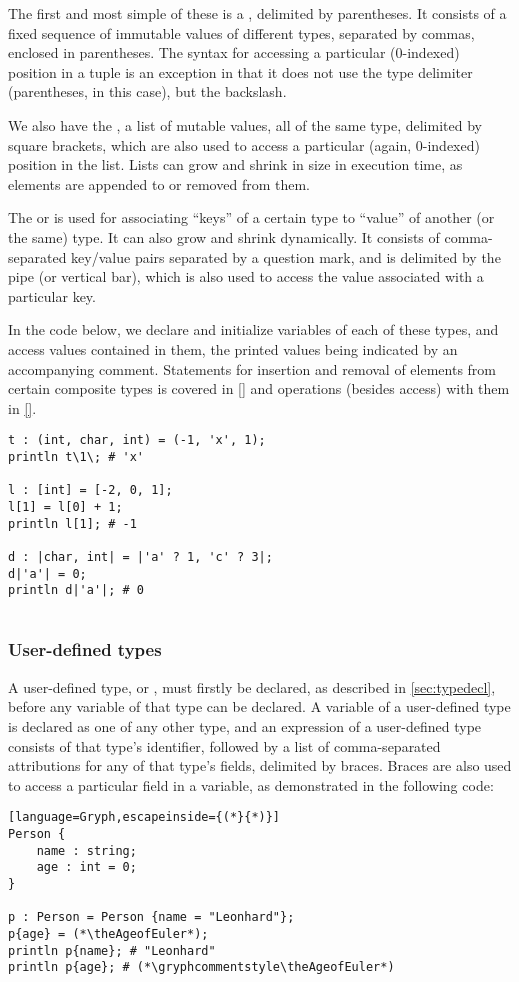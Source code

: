 The first and most simple of these is a , delimited by parentheses. It consists of a fixed sequence of immutable values of different types, separated by commas, enclosed in parentheses. The syntax for accessing a particular (0-indexed) position in a tuple is an exception in that it does not use the type delimiter (parentheses, in this case), but the backslash.

We also have the , a list of mutable values, all of the same type, delimited by square brackets, which are also used to access a particular (again, 0-indexed) position in the list. Lists can grow and shrink in size in execution time, as elements are appended to or removed from them.

The  or  is used for associating ``keys'' of a certain type to ``value'' of another (or the same) type. It can also grow and shrink dynamically. It consists of comma-separated key/value pairs separated by a question mark, and is delimited by the pipe (or vertical bar), which is also used to access the value associated with a particular key.


In the code below, we declare and initialize variables of each of these types, and access values contained in them, the printed values being indicated by an accompanying comment. Statements for insertion and removal of elements from certain composite types is covered in \ref{} and operations (besides access) with them in \ref{}.
\begin{lstlisting}[language=Gryph]
t : (int, char, int) = (-1, 'x', 1);
println t\1\; # 'x'

l : [int] = [-2, 0, 1];
l[1] = l[0] + 1;
println l[1]; # -1

d : |char, int| = |'a' ? 1, 'c' ? 3|;
d|'a'| = 0;
println d|'a'|; # 0


\end{lstlisting}
\subsubsection{User-defined types}
\label{sec:usertypes}
A user-defined type, or , must firstly be declared, as described in \ref{sec:typedecl}, before any variable of that type can be declared. A variable of a user-defined type is declared as one of any other type, and an expression of a user-defined type consists of that type's identifier, followed by a list of comma-separated attributions for any of that type's fields, delimited by braces. Braces are also used to access a particular field in a  variable, as demonstrated in the following code:
\setcounter{AgeofEuler}{\year-1707}
\begin{lstlisting}[language=Gryph,escapeinside={(*}{*)}]
Person {
	name : string;
	age : int = 0;
}

p : Person = Person {name = "Leonhard"};
p{age} = (*\theAgeofEuler*);
println p{name}; # "Leonhard"
println p{age}; # (*\gryphcommentstyle\theAgeofEuler*)
\end{lstlisting}